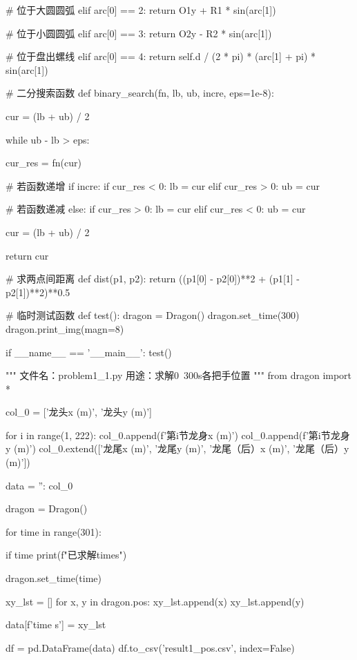\documentclass[withoutpreface,bwprint]{cumcmthesis}
\begin{document}
\begin{CodeText}
      # 位于大圆圆弧
      elif arc[0] == 2:
          return O1y + R1 * sin(arc[1])

      # 位于小圆圆弧
      elif arc[0] == 3:
          return O2y - R2 * sin(arc[1])

      # 位于盘出螺线
      elif arc[0] == 4:
          return self.d / (2 * pi) * (arc[1] + pi) * sin(arc[1])


# 二分搜索函数
def binary_search(fn, lb, ub, incre, eps=1e-8):


      cur = (lb + ub) / 2

      while ub - lb > eps:

         cur_res = fn(cur)

         # 若函数递增
         if incre:
               if cur_res < 0:
                   lb = cur
               elif cur_res > 0:
                   ub = cur

         # 若函数递减
         else:
               if cur_res > 0:
                   lb = cur
               elif cur_res < 0:
                   ub = cur

         cur = (lb + ub) / 2

      return cur

# 求两点间距离
def dist(p1, p2):
      return ((p1[0] - p2[0])**2 + (p1[1] - p2[1])**2)**0.5


# 临时测试函数
def test():
      dragon = Dragon()
      dragon.set_time(300)
      dragon.print_img(magn=8)


if __name__ == '__main__':
      test()
\end{CodeText}
\begin{CodeText}
"""
文件名：problem1_1.py
用途：求解0~300s各把手位置
"""
from dragon import *

col_0 = ['龙头x (m)', '龙头y (m)']

for i in range(1, 222):
      col_0.append(f'第{i}节龙身x (m)')
      col_0.append(f'第{i}节龙身y (m)')
col_0.extend(['龙尾x (m)', '龙尾y (m)', '龙尾（后）x (m)', '龙尾（后）y (m)'])

data = {'': col_0}

dragon = Dragon()

for time in range(301):

      if time %
         print(f"已求解{time}s")

      dragon.set_time(time)

      xy_lst = []
      for x, y in dragon.pos:
         xy_lst.append(x)
         xy_lst.append(y)

      data[f'{time} s'] = xy_lst

df = pd.DataFrame(data)
df.to_csv('result1_pos.csv', index=False)
\end{CodeText}
\end{document}
